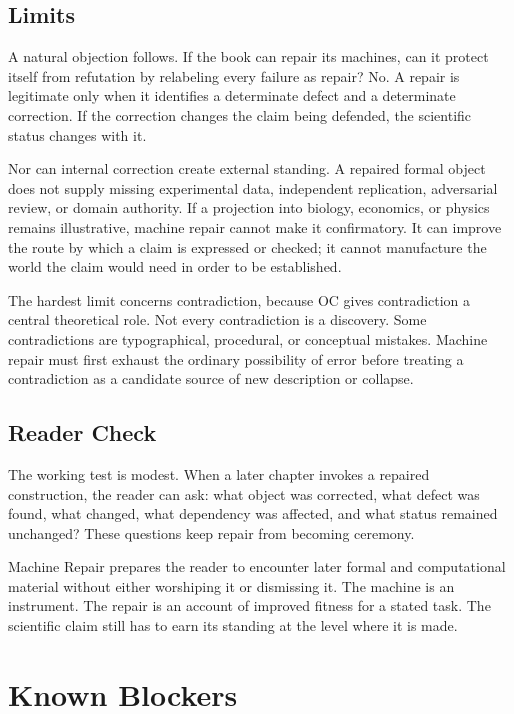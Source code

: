 \documentclass[11pt,a4paper,openany]{book}
\begin{document}
\subsection{Limits}
A natural objection follows. If the book can repair its machines, can it protect itself from refutation by relabeling every failure as repair? No. A repair is legitimate only when it identifies a determinate defect and a determinate correction. If the correction changes the claim being defended, the scientific status changes with it. \cite{kadanoff_scaling,wilson_renormalization}\par
Nor can internal correction create external standing. A repaired formal object does not supply missing experimental data, independent replication, adversarial review, or domain authority. If a projection into biology, economics, or physics remains illustrative, machine repair cannot make it confirmatory. It can improve the route by which a claim is expressed or checked; it cannot manufacture the world the claim would need in order to be established.\par
The hardest limit concerns contradiction, because OC gives contradiction a central theoretical role. Not every contradiction is a discovery. Some contradictions are typographical, procedural, or conceptual mistakes. Machine repair must first exhaust the ordinary possibility of error before treating a contradiction as a candidate source of new description or collapse.\par
\subsection{Reader Check}
The working test is modest. When a later chapter invokes a repaired construction, the reader can ask: what object was corrected, what defect was found, what changed, what dependency was affected, and what status remained unchanged? These questions keep repair from becoming ceremony. \cite{kadanoff_scaling,wilson_renormalization}\par
Machine Repair prepares the reader to encounter later formal and computational material without either worshiping it or dismissing it. The machine is an instrument. The repair is an account of improved fitness for a stated task. The scientific claim still has to earn its standing at the level where it is made.\par
\section{Known Blockers}
\end{document}
